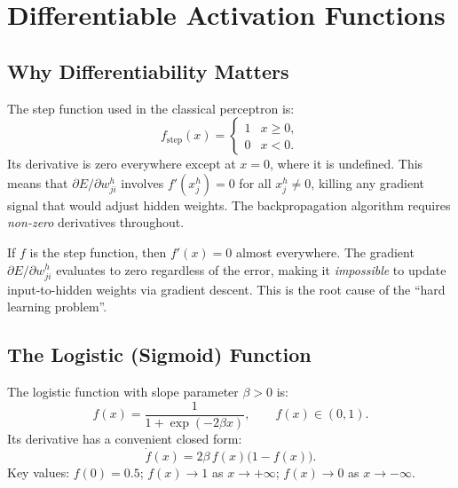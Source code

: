 \documentclass[12pt,a4paper]{article}
\begin{document}
\section{Differentiable Activation Functions}
\label{sec:activations}

\subsection{Why Differentiability Matters}
\label{subsec:why-diff}

The step function used in the classical perceptron is:
\begin{equation}
  f_{\mathrm{step}}(x) = \begin{cases} 1 & x \geq 0, \\ 0 & x < 0. \end{cases}
  \label{eq:step}
\end{equation}
Its derivative is zero everywhere except at $x=0$, where it is undefined.
This means that $\partial E / \partial w_{ji}^h$ involves $f'(x_j^h) = 0$
for all $x_j^h \neq 0$, killing any gradient signal that would adjust hidden
weights.  The backpropagation algorithm requires \emph{non-zero} derivatives
throughout.

\begin{warningbox}[title=The Step Function Cannot be Used in Hidden Layers]
  If $f$ is the step function, then $f'(x) = 0$ almost everywhere.  The
  gradient $\partial E / \partial w_{ji}^h$ evaluates to zero regardless of
  the error, making it \emph{impossible} to update input-to-hidden weights via
  gradient descent.  This is the root cause of the ``hard learning problem''.
\end{warningbox}

\subsection{The Logistic (Sigmoid) Function}
\label{subsec:logistic}

The logistic function with slope parameter $\beta > 0$ is:
\begin{equation}
  f(x) = \frac{1}{1 + \exp(-2\beta x)},
  \qquad f(x) \in (0, 1).
  \label{eq:logistic}
\end{equation}
Its derivative has a convenient closed form:
\begin{equation}
  \dot{f}(x) = 2\beta\, f(x)\bigl(1 - f(x)\bigr).
  \label{eq:logistic-deriv}
\end{equation}
Key values: $f(0) = 0.5$; $f(x) \to 1$ as $x \to +\infty$; $f(x) \to 0$
as $x \to -\infty$.
\end{document}
